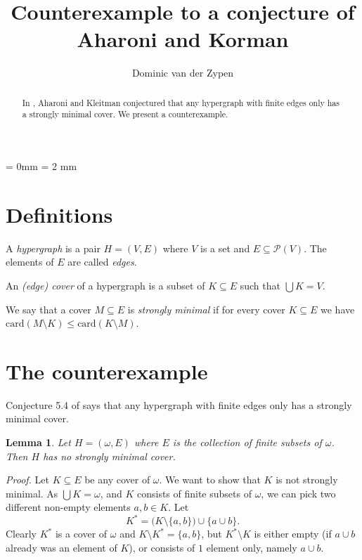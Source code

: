 \documentclass[12pt]{amsart}
\newtheorem{lemma}{\bf Lemma}[section]
\newcommand{\Pow}{{\mathcal P}}
\newcommand{\card}{{\mathrm{card}}}
\begin{document}
\title{Counterexample to a conjecture of Aharoni and Korman}

\author{Dominic van der Zypen}
\address{Swiss Armed Forces, CH-3003 Bern,
Switzerland}


\begin{abstract}
	In \cite{Ah}, Aharoni and Kleitman conjectured that
	any hypergraph with finite edges only has a strongly
	minimal cover. We present a counterexample.
\end{abstract}
\parindent = 0mm
\parskip = 2 mm
\maketitle

\section{Definitions}

A {\em hypergraph} is a pair $H=(V,E)$
where $V$ is a set and $E\subseteq \Pow(V)$. The elements of
$E$ are called {\em edges}.

An {\em (edge) cover} of a hypergraph is a subset of 
$K\subseteq E$ such that $\bigcup K = V$. 

We say that a cover $M \subseteq E$ is {\em strongly minimal} if for every
cover $K\subseteq E$ we have $\card(M\setminus K) \leq \card(K\setminus M)$.

\section{The counterexample}
Conjecture 5.4 of \cite{Ah} says that 
any hypergraph with finite edges only has a strongly
minimal cover. 
\begin{lemma} Let $H= (\omega, E)$ where $E$ is the collection of 
	finite subsets of $\omega$. Then $H$ has no strongly minimal
	cover.
\end{lemma}
{\em Proof.} Let $K\subseteq E$ be any cover of $\omega$. We want to 
show that $K$ is not strongly minimal. As $\bigcup K = \omega$, and $K$
consists of finite subsets of $\omega$, we
can pick two
different non-empty elements $a, b\in K$. Let $$K^* = 
\big(K \setminus \{a, b\}\big) \cup \{a \cup b\}.$$
Clearly $K^*$ is a cover of $\omega$ and $K \setminus K^* = \{a, b\}$,
but $K^*\setminus K$ is either empty (if $a\cup b$ already was an element 
of $K$), or consists of $1$ element only, namely $a\cup b$. 
\end{document}
